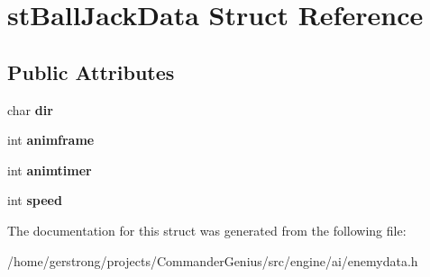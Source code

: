 \hypertarget{structst_ball_jack_data}{
\section{stBallJackData Struct Reference}
\label{structst_ball_jack_data}
}
\subsection*{Public Attributes}
\begin{DoxyCompactItemize}
\item 
\hypertarget{structst_ball_jack_data_a27edd0facf65422fd7686608e863322d}{
char {\bfseries dir}}
\label{structst_ball_jack_data_a27edd0facf65422fd7686608e863322d}

\item 
\hypertarget{structst_ball_jack_data_a365e2eacaaae81e0e197b822f6e9ec3c}{
int {\bfseries animframe}}
\label{structst_ball_jack_data_a365e2eacaaae81e0e197b822f6e9ec3c}

\item 
\hypertarget{structst_ball_jack_data_a27e68e23035a15615a871f20ebcced5d}{
int {\bfseries animtimer}}
\label{structst_ball_jack_data_a27e68e23035a15615a871f20ebcced5d}

\item 
\hypertarget{structst_ball_jack_data_a1352d2713a6c2b62d2c22f5b78e941ca}{
int {\bfseries speed}}
\label{structst_ball_jack_data_a1352d2713a6c2b62d2c22f5b78e941ca}

\end{DoxyCompactItemize}


The documentation for this struct was generated from the following file:\begin{DoxyCompactItemize}
\item 
/home/gerstrong/projects/CommanderGenius/src/engine/ai/enemydata.h\end{DoxyCompactItemize}
